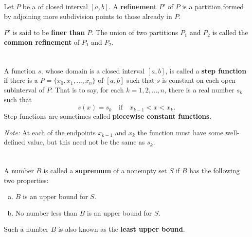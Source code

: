 \documentclass{report}
\begin{document}
\section{}%
\label{ref:refinement}

Let $P$ be a  of closed interval $[a, b]$.
A \textbf{refinement} $P'$ of $P$ is a partition formed by adjoining more
  subdivision points to those already in $P$.

$P'$ is said to be \textbf{finer than} $P$. The union of two partitions $P_1$
  and $P_2$ is called the \textbf{common refinement} of $P_1$ and $P_2$.

\section{}%
\label{ref:step-function}

A function $s$, whose domain is a closed interval $[a, b]$, is called a
  \textbf{step function} if there is a 
  $P = \{x_0, x_1, \ldots, x_n\}$ of $[a, b]$ such that $s$ is constant on each
  open subinterval of $P$.
That is to say, for each $k = 1, 2, \ldots, n$, there is a real number $s_k$
  such that $$s(x) = s_k \quad\text{if}\quad x_{k-1} < x < x_k.$$
  Step functions are sometimes called \textbf{piecewise constant functions}.

\vspace{8pt}
\noindent
\textit{Note:} At each of the endpoints $x_{k-1}$ and $x_k$ the function must
  have some well-defined value, but this need not be the same as $s_k$.

\begin{definition}


\end{definition}

\section{}%
\label{ref:supremum}

A number $B$ is called a \textbf{supremum} of a nonempty set $S$ if $B$ has
  the following two properties:
  \begin{enumerate}[(a)]
    \item $B$ is an upper bound for $S$.
    \item No number less than $B$ is an upper bound for $S$.
  \end{enumerate}
Such a number $B$ is also known as the \textbf{least upper bound}.
\end{document}
